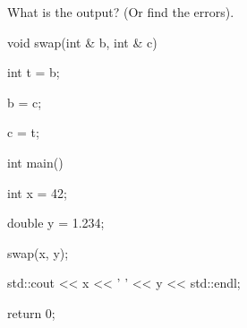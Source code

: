 What is the output? (Or find the errors).



\begin{consolethree}[escapeinside=||]

void swap(int & b, int & c)

{

    int t = b;

    b = c;

    c = t;

}



int main()

{

    int x = 42;

    double y = 1.234;

    swap(x, y);

    std::cout << x << ' ' << y << std::endl;

    return 0;

}

\end{consolethree}

